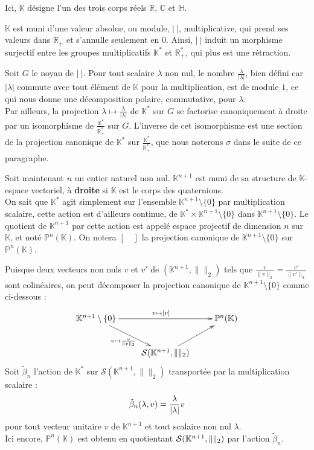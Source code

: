Ici, $\mathbb{K}$ d\'esigne l'un des trois corps r\'eels $\mathbb{R}$, $\mathbb{C}$ et $\mathbb{H}$.

\medskip
$\mathbb{K}$ est muni d'une valeur absolue, ou module, $|\ |$, multiplicative, qui prend ses valeurs dans $\mathbb{R}_+$ et s'annulle seulement en $0$. %
Ainsi, $|\ |$ induit un morphisme surjectif entre les groupes multiplicatifs $\mathbb{K}^{\ast}$ et $\mathbb{R}_+^{\ast}$, qui plus est une r\'etraction.

Soit $G$ le noyau de $|\ |$. Pour tout scalaire $\lambda$ non nul, le nombre $\frac{\lambda}{|\lambda|}$, %
bien d\'efini car $|\lambda |$ commute avec tout \'el\'ement de $\mathbb{K}$ pour la multiplication, %
est de module $1$, ce qui nous donne une d\'ecomposition polaire, commutative, pour $\lambda$.\\
Par ailleurs, la projection $\lambda\mapsto\frac{\lambda}{|\lambda|}$ de $\mathbb{K}^{\ast}$ sur $G$ se factorise canoniquement \`a droite %
par un isomorphisme de $\frac{\mathbb{K}^{\ast}}{\mathbb{R}_+^{\ast}}$ sur $G$. %
L'inverse de cet isomorphisme est une section de la projection canonique de $\mathbb{K}^{\ast}$ sur $\frac{\mathbb{K}^{\ast}}{\mathbb{R}_+^{\ast}}$, que nous noterons $\sigma$ dans le suite de ce paragraphe.

\etoile

Soit maintenant $n$ un entier naturel non nul. $\mathbb{K}^{n+1}$ est muni de sa structure de $\mathbb{K}$-espace vectoriel, \`a \textbf{droite} si $\mathbb{K}$ est le corps des quaternions.\\
On sait que $\mathbb{K}^{\ast}$ agit simplement sur l'ensemble $\mathbb{K}^{n+1}\setminus\{0\}$ par multiplication scalaire, %
cette action est d'ailleurs continue, de $\mathbb{K}^{\ast}\times\mathbb{K}^{n+1}\setminus\{0\}$ dans $\mathbb{K}^{n+1}\setminus\{0\}$. %
Le quotient de $\mathbb{K}^{n+1}$ par cette action est appel\'e espace projectif de dimension $n$ sur $\mathbb{K}$, %
et not\'e $\mathbb{P}^n(\mathbb{K})$. On notera $[\quad]$ la projection canonique de $\mathbb{K}^{n+1}\setminus\{0\}$ sur $\mathbb{P}^n(\mathbb{K})$.

Puisque deux vecteurs non nuls $v$ et $v'$ de $(\mathbb{K}^{n+1},\|\|_2)$ tels que $\frac{v}{\|v\|_2}=\frac{v'}{\|v'\|_2}$ sont colin\'eaires, %
on peut d\'ecomposer la projection canonique de $\mathbb{K}^{n+1}\setminus\{0\}$ comme ci-dessous :
\[
\xymatrix{%
\mathbb{K}^{n+1}\setminus\{0\} \ar[rd]_{v\mapsto\frac{v}{\|v\|_2}} \ar[rr]^{v\mapsto [v]} & & \mathbb{P}^n(\mathbb{K})\\%
 & \Sk{K} \ar[ru]
}
\]
Soit $\tilde{\beta}_n$ l'action de $\mathbb{K}^{\ast}$ sur $\mathcal{S}(\mathbb{K}^{n+1},\|\|_2)$ transport\'ee par la multiplication scalaire :
\[\tilde{\beta}_n(\lambda ,v)=\frac{\lambda}{\lvert\lambda\rvert}v\]
pour tout vecteur unitaire $v$ de $\mathbb{K}^{n+1}$ et tout scalaire non nul $\lambda$.\\
Ici encore, $\mathbb{P}^n(\mathbb{K})$ est obtenu en quotientant $\mathcal{S}(\mathbb{K}^{n+1},\|\|_2)$ par l'action $\tilde{\beta}_n$.

